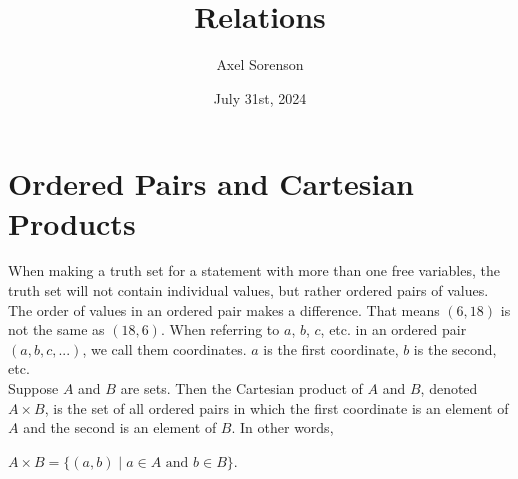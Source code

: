 \documentclass{article}
\title{Relations}
\author{Axel Sorenson}
\date{July 31st, 2024}
\begin{document}
\maketitle

\section{Ordered Pairs and Cartesian Products}
When making a truth set for a statement with more than one free variables, the truth set will not contain individual values, but rather ordered pairs of values. The order of values in an ordered pair makes a difference. That means $(6, 18)$ is not the same as $(18, 6)$. When referring to $a$, $b$, $c$, etc. in an ordered pair $(a, b, c, ...)$, we call them \glspl{coordinate}. $a$ is the first coordinate, $b$ is the second, etc.\\

\noindent Suppose $A$ and $B$ are sets. Then the Cartesian product of $A$ and $B$, denoted $A \times B$, is the set of all ordered pairs in which the first coordinate is an element of $A$ and the second is an element of $B$. In other words,
\begin{center}
$A \times B = \{(a,b) \mid a \in A \text{ and } b \in B\}$.
\end{center}


\clearpage
\printglossary[type=\acronymtype,style=long]  %
\printglossary[type=symbolslist,style=long]   %
\printglossary[type=main]                     %
\end{document}
